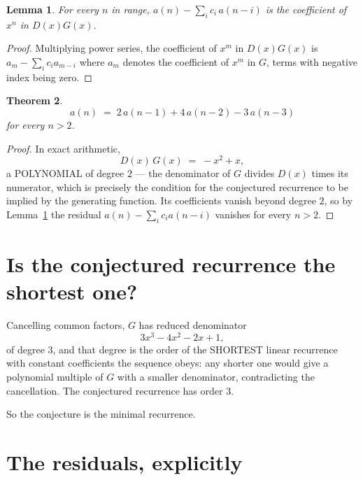 \documentclass[11pt,a4paper]{article}
\theoremstyle{plain}
\newtheorem{theorem}{Theorem}
\newtheorem{lemma}[theorem]{Lemma}
\theoremstyle{definition}
\begin{document}
\begin{lemma}\label{lem:key}
For every $n$ in range, $a(n)-\sum_i c_i\,a(n-i)$ is the coefficient of $x^{n}$ in
$D(x)G(x)$.
\end{lemma}

\begin{proof}
Multiplying power series, the coefficient of $x^{m}$ in $D(x)G(x)$ is
$a_m-\sum_i c_i a_{m-i}$ where $a_m$ denotes the coefficient of $x^{m}$ in $G$, terms with
negative index being zero.
\end{proof}

\begin{theorem}
\[
a(n)\;=\;2\,a(n-1) + 4\,a(n-2) - 3\,a(n-3)
\]
for every $n>2$.
\end{theorem}

\begin{proof}
In exact arithmetic,
\[
D(x)\,G(x)\;=\;- x^{2} + x,
\]
a POLYNOMIAL of degree $2$ --- the denominator of $G$ divides $D(x)$ times its numerator,
which is precisely the condition for the conjectured recurrence to be implied by the
generating function. Its coefficients vanish beyond degree $2$, so by
Lemma~\ref{lem:key} the residual $a(n)-\sum_ic_ia(n-i)$ vanishes for every
$n>2$.
\end{proof}

\section{Is the conjectured recurrence the shortest one?}

Cancelling common factors, $G$ has reduced denominator
\[
3 x^{3} - 4 x^{2} - 2 x + 1,
\]
of degree $3$, and that degree is the order of the SHORTEST linear recurrence with
constant coefficients the sequence obeys: any shorter one would give a polynomial multiple of
$G$ with a smaller denominator, contradicting the cancellation. The conjectured recurrence has
order $3$.

So the conjecture is the minimal recurrence.

\section{The residuals, explicitly}
\end{document}

